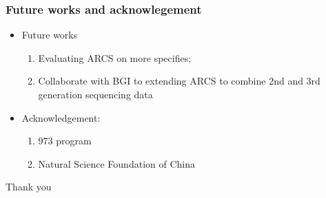 \documentclass[mathserif]{beamer}
\begin{document}
		
		\begin{frame} 
			\frametitle{Future works and acknowlegement}
	\begin{itemize}
	
	\item Future works	
			\begin{enumerate}
				\item Evaluating ARCS on more specifies;
				\item Collaborate with BGI to extending ARCS to combine 2nd and 3rd generation sequencing data 
			\end{enumerate}	
	\item Acknowledgement: 
		\begin{enumerate}
			\item 973 program 
			\item Natural Science Foundation of China
			\end{enumerate}
	
	\end{itemize}
		\end{frame}
		
		\begin{frame}	
			\begin{block}{}
			Thank you
			\end{block}
		\end{frame}
		
\end{document}
